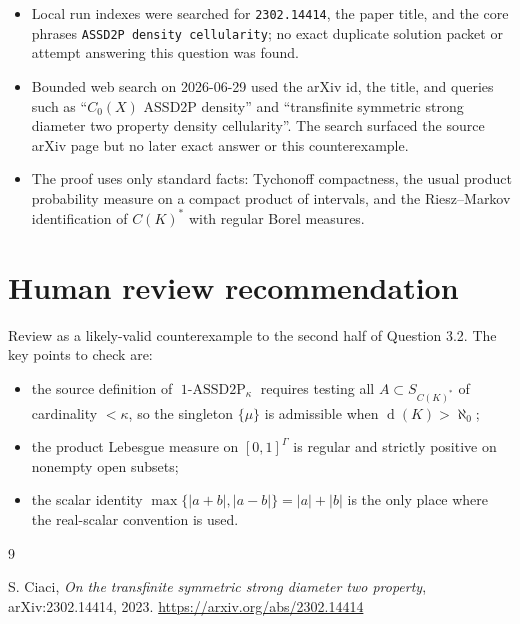 \documentclass[11pt]{amsart}
\theoremstyle{remark}
\DeclareMathOperator{\dens}{d}
\DeclareMathOperator{\ASSD}{1\mbox{-}ASSD2P}
\begin{document}
\begin{itemize}[leftmargin=*]
\item Local run indexes were searched for \texttt{2302.14414}, the paper
title, and the core phrases \texttt{ASSD2P density cellularity}; no exact
duplicate solution packet or attempt answering this question was found.
\item Bounded web search on 2026-06-29 used the arXiv id, the title, and
queries such as ``$C_0(X)$ ASSD2P density'' and ``transfinite symmetric strong
diameter two property density cellularity''.  The search surfaced the source
arXiv page but no later exact answer or this counterexample.
\item The proof uses only standard facts: Tychonoff compactness, the usual
product probability measure on a compact product of intervals, and the
Riesz--Markov identification of $C(K)^*$ with regular Borel measures.
\end{itemize}

\section*{Human review recommendation}

Review as a likely-valid counterexample to the second half of Question 3.2.
The key points to check are:
\begin{itemize}[leftmargin=*]
\item the source definition of $\ASSD_{\kappa}$ requires testing all
$A\subset S_{C(K)^*}$ of cardinality $<\kappa$, so the singleton
$\{\mu\}$ is admissible when $\dens(K)>\aleph_0$;
\item the product Lebesgue measure on $[0,1]^\Gamma$ is regular and strictly
positive on nonempty open subsets;
\item the scalar identity
$\max\{|a+b|,|a-b|\}=|a|+|b|$ is the only place where the real-scalar
convention is used.
\end{itemize}

\begin{thebibliography}{9}

S. Ciaci,
\emph{On the transfinite symmetric strong diameter two property},
arXiv:2302.14414, 2023.
\url{https://arxiv.org/abs/2302.14414}

\end{thebibliography}
\end{document}
